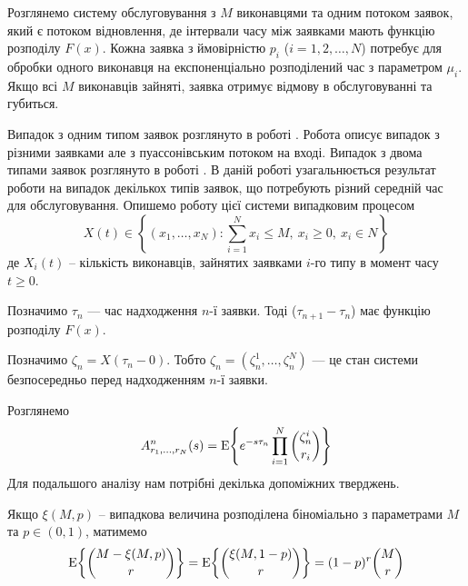 \documentclass{KnuBulletin}
\begin{document}
\begin{multicols}{2}
    \noindent

    Розглянемо систему обслуговування з $M$ виконавцями та одним потоком заявок, який є потоком відновлення, де інтервали часу між заявками мають функцію розподілу $F(x)$. Кожна заявка з ймовірністю $p_i$ ($i=1,2,\dots,N$) потребує для обробки одного виконавця на експоненціально розподілений час з параметром $\mu_i$. Якщо всі $M$ виконавців зайняті, заявка отримує відмову в обслуговуванні та губиться.
    
    Випадок з одним типом заявок розглянуто в роботі \cite{takacs1962}. Робота \cite{lebedev1999queuing} описує випадок з різними заявками але з пуассонівським потоком на вході. Випадок з двома типами заявок розглянуто в роботі \cite{Ert2013servers2}.
    В даній роботі узагальнюється результат роботи \cite{Ert2013servers2} на випадок декількох типів заявок, що потребують різний середній час для обслуговування.
    Опишемо роботу цієї системи випадковим процесом
    \begin{equation*}
    X(t) \in \left\{ (x_1,\dots,x_N): \sum_{i=1}^{N} x_i \le M,\ x_i \ge 0,\ x_i \in N \right\}
    \end{equation*}
    де $X_i(t)$ -- кількість виконавців, зайнятих заявками $i$-го типу в момент часу $t\ge0$.
    
    Позначимо $\tau_n$ --- час надходження $n$-ї заявки. Тоді ($\tau_{n+1}-\tau_{n}$) має функцію розподілу $F(x)$.
    
    Позначимо $\zeta_n=X(\tau_n-0)$. 
    Тобто $\zeta_n=(\zeta_n^1,\dots,\zeta_n^N)$ --- це стан системи безпосередньо перед надходженням $n$-ї заявки.

    Розглянемо
    \begin{gather*}
    A_{r_1,...,r_N}^{n}(s) = {{\rm E}{\left\{ e^{-s \tau_{n}} \prod_{i=1}^N \dbinom{\zeta_{n}^i}{r_i}\right\}}}
    \end{gather*}    
    Для подальшого аналізу нам потрібні декілька допоміжних тверджень.
    
    \begin{lemma}
        \label{lem:binom-expectation}
        Якщо $\xi(M,p)$ -- випадкова величина розподілена біноміально з параметрами $M$ та $p\in(0,1)$, матимемо
        \begin{gather*}
        {{\rm E}{\left\{ \dbinom{M-\xi(M,p)}{r}\right\}}}
        ={{\rm E}{\left\{ \dbinom{\xi(M,1-p)}{r}\right\}}}
        =(1-p)^r \dbinom{M}{r}
        \end{gather*}
    \end{lemma}


\end{multicols}
\end{document}
